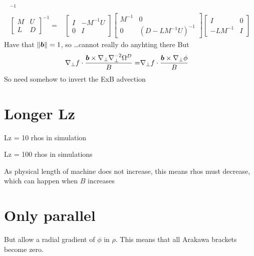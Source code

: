 \begin{align*}
    ^{-1}
    \\
     \begin{bmatrix}
        M & U \\
        L & D
    \end{bmatrix}
    ^{-1}
    =&
    \begin{bmatrix}
        I & -M^{-1} U\\
        0 & I
    \end{bmatrix}
    \begin{bmatrix}
        M^{-1} & 0 \\
        0 & (D-L M^{-1} U)^{-1}
    \end{bmatrix}
    \begin{bmatrix}
        I & 0 \\
        -L M^{-1} & I
    \end{bmatrix}
\end{align*}
%
Have that $\|\boldsymbol{b}\|=1$, so \ldots cannot really do anyhting there
But
%
\begin{align*}
    \nabla_\perp f\cdot\frac{\boldsymbol{b}\times\nabla_\perp\nabla_\perp^{-2}\Omega^D}{B}
    =& \nabla_\perp f\cdot\frac{\boldsymbol{b}\times\nabla_\perp\phi}{B}
\end{align*}
%
So need somehow to invert the ExB advection

\section{Longer Lz}
%
Lz = 10 rhos in simulation

Lz = 100 rhos in simulations

As physical length of machine does not increase, this means rhos must decrease, which can happen when $B$ increases

\section{Only parallel}
%
But allow a radial gradient of $\phi$ in $\rho$.
This means that all Arakawa brackets become zero.

